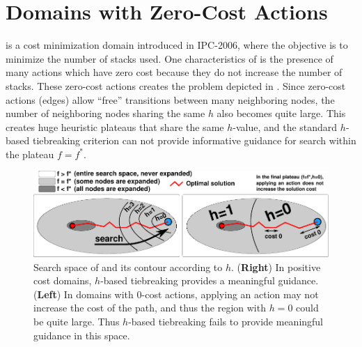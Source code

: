 \section{Domains with Zero-Cost Actions}
\label{sec:zerocost-domains}
  is a cost
minimization domain introduced in IPC-2006, where the objective is to 
minimize the number of stacks used.
One characteristics of  is the presence of many  actions which have zero cost because they do not increase the number of stacks. These zero-cost actions creates the problem depicted in .
Since zero-cost actions (edges) allow ``free'' transitions between many neighboring nodes,
the number of neighboring nodes sharing the same $h$ also becomes quite large.
This creates huge heuristic plateaus that share the same $h$-value, and the standard $h$-based tiebreaking criterion can not provide informative guidance for search within the plateau $f=f^*$.

\begin{figure}[htbp]
  \centering
  \includegraphics{img/astar/plateau-1.pdf}
 \caption{Search space of \astar and its contour according to $h$. (\textbf{Right}) In positive cost domains, $h$-based tiebreaking provides a meaningful guidance. (\textbf{Left}) In domains with 0-cost actions, applying an action may not increase the cost of the path, and thus the region with $h=0$ could be quite large. Thus $h$-based tiebreaking fails to provide meaningful guidance in this space.
  }
 \label{fig:plateau-1}
\end{figure}



